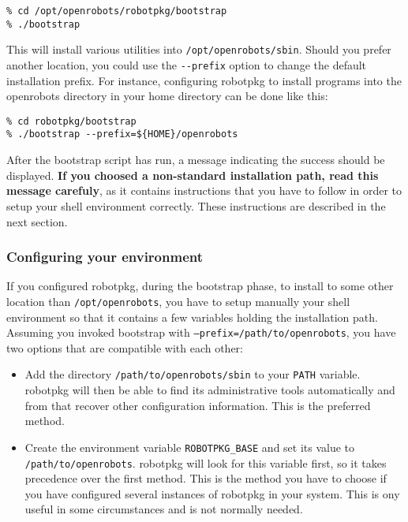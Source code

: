 \begin{verbatim}
% cd /opt/openrobots/robotpkg/bootstrap
% ./bootstrap
\end{verbatim}

This will  install various utilities   into {\tt /opt/openrobots/sbin}.  Should
you prefer another   location, you could  use the  {\tt -{}-prefix}  option  to
change the default installation  prefix.  For instance, configuring robotpkg to
install programs  into the openrobots directory  in your home directory  can be
done like this:

\begin{verbatim}
% cd robotpkg/bootstrap
% ./bootstrap --prefix=${HOME}/openrobots
\end{verbatim}

After the bootstrap script has run, a message  indicating the success should be
displayed.   {\bf If you choosed  a  non-standard installation path, read  this
message carefuly}, as it contains instructions that you have to follow in order
to setup your shell environment correctly.  These instructions are described in
the next section.


\subsubsection{Configuring your environment} %

If  you configured robotpkg,   during the bootstrap  phase,  to install to some
other location   than {\tt /opt/openrobots}, you  have   to setup manually your
shell environment so that it contains a few  variables holding the installation
path.  Assuming  you invoked bootstrap with {\tt --prefix=/path/to/openrobots},
you have two options that are compatible with each other:

\begin{itemize}
   \item Add  the directory {\tt  /path/to/openrobots/sbin}  to your {\tt PATH}
   variable. robotpkg will    then be able  to find    its administrative tools
   automatically and from that recover other configuration information. This is
   the preferred method.

   \item Create the environment variable {\tt ROBOTPKG\_BASE} and set its value
   to {\tt /path/to/openrobots}.  robotpkg will  look for this variable  first,
   so it takes precedence over the  first method.  This is  the method you have
   to choose  if  you have  configured  several instances  of robotpkg  in your
   system. This is ony useful in some circumstances and is not normally needed.
\end{itemize}

